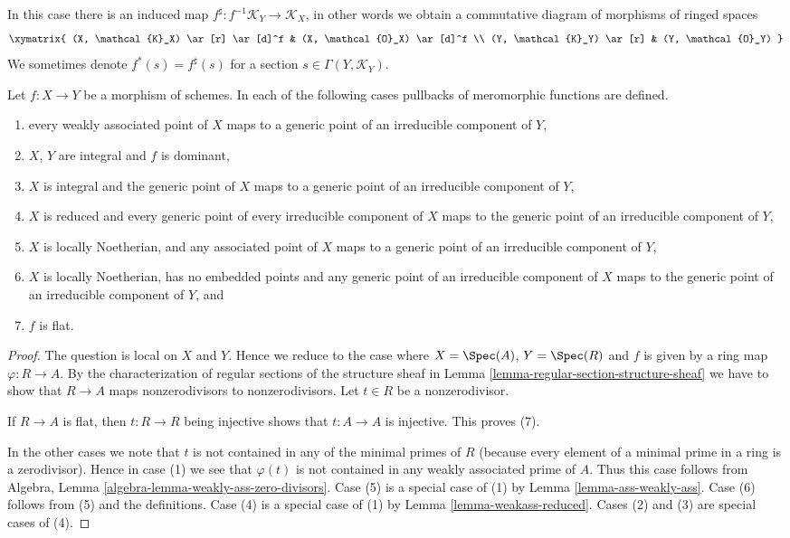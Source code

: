 \noindent
In this case there is an induced map
$f^\sharp : f^{-1}\mathcal{K}_Y \to \mathcal{K}_X$,
in other words we obtain a commutative diagram of morphisms
of ringed spaces
$$
\xymatrix{
(X, \mathcal{K}_X) \ar[r] \ar[d]^f &
(X, \mathcal{O}_X) \ar[d]^f \\
(Y, \mathcal{K}_Y) \ar[r] &
(Y, \mathcal{O}_Y)
}
$$
We sometimes denote $f^*(s) = f^\sharp(s)$ for a
section $s \in \Gamma(Y, \mathcal{K}_Y)$.

\begin{lemma}
\label{lemma-pullback-meromorphic-sections-defined}
Let $f : X \to Y$ be a morphism of schemes.
In each of the following cases pullbacks of meromorphic
functions are defined.
\begin{enumerate}
\item every weakly associated point of $X$ maps to
a generic point of an irreducible component of $Y$,
\item $X$, $Y$ are integral and $f$ is dominant,
\item $X$ is integral and the generic point of $X$ maps
to a generic point of an irreducible component of $Y$,
\item $X$ is reduced and every generic point of every irreducible
component of $X$ maps to the generic point of an irreducible component
of $Y$,
\item $X$ is locally Noetherian, and any associated point of
$X$ maps to a generic point of an irreducible component of $Y$,
\item $X$ is locally Noetherian, has no embedded points and
any generic point of an irreducible component of
$X$ maps to the generic point of an irreducible component of $Y$, and
\item $f$ is flat.
\end{enumerate}
\end{lemma}

\begin{proof}
The question is local on $X$ and $Y$. Hence we reduce to the case where
$X = \Spec(A)$, $Y = \Spec(R)$ and $f$ is given by a ring map
$\varphi : R \to A$.
By the characterization of regular sections of the structure sheaf
in Lemma \ref{lemma-regular-section-structure-sheaf} we have to
show that $R \to A$ maps nonzerodivisors to nonzerodivisors.
Let $t \in R$ be a nonzerodivisor.

\medskip\noindent
If $R \to A$ is flat, then $t : R \to R$ being injective
shows that $t : A \to A$ is injective. This proves (7).

\medskip\noindent
In the other cases we note that $t$ is not contained in any of
the minimal primes of $R$ (because every element of a minimal
prime in a ring is a zerodivisor).
Hence in case (1) we see that $\varphi(t)$ is not contained
in any weakly associated prime of $A$. Thus this case follows from
Algebra, Lemma \ref{algebra-lemma-weakly-ass-zero-divisors}.
Case (5) is a special case of (1) by Lemma \ref{lemma-ass-weakly-ass}.
Case (6) follows from (5) and the definitions.
Case (4) is a special case of (1) by
Lemma \ref{lemma-weakass-reduced}.
Cases (2) and (3) are special cases of (4).
\end{proof}


